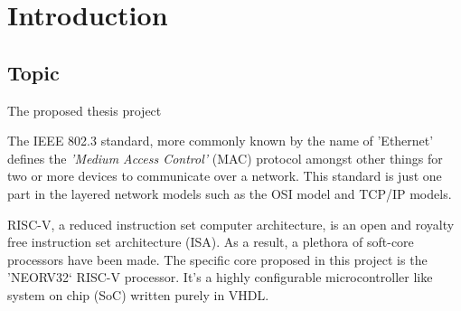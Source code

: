 \chapter[Introduction]{Introduction}
\label{Chap:Intro}


\section{Topic}

The proposed thesis project 

The IEEE 802.3 standard\cite{IEEE802.3-2012}, more commonly known by the name of 'Ethernet' defines the \textit{'Medium Access Control'} (MAC) protocol amongst other things for two or more devices to communicate over a network. This standard is just one part in the layered network models such as the OSI model and TCP/IP models. 


RISC-V, a reduced instruction set computer architecture, is an open and royalty free instruction set architecture (ISA). As a result, a plethora of soft-core processors have been made. The specific core proposed in this project is the 'NEORV32` RISC-V processor. It's a highly configurable microcontroller like system on chip (SoC) written purely in VHDL.






